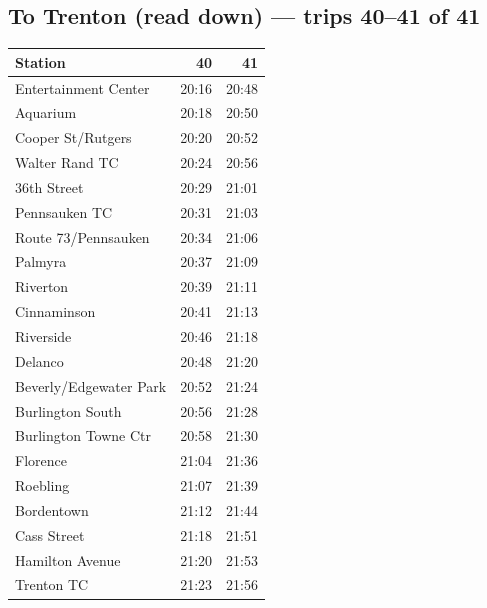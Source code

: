 \subsection*{To Trenton (read down) --- trips 40--41 of 41}
\begin{center}\footnotesize\setlength{\tabcolsep}{3pt}\begin{tabular}{@{}lrr@{}}\toprule
Station & 40 & 41 \\\midrule
Entertainment Center & 20:16 & 20:48 \\
Aquarium & 20:18 & 20:50 \\
Cooper St/Rutgers & 20:20 & 20:52 \\
Walter Rand TC & 20:24 & 20:56 \\
36th Street & 20:29 & 21:01 \\
Pennsauken TC & 20:31 & 21:03 \\
Route 73/Pennsauken & 20:34 & 21:06 \\
Palmyra & 20:37 & 21:09 \\
Riverton & 20:39 & 21:11 \\
Cinnaminson & 20:41 & 21:13 \\
Riverside & 20:46 & 21:18 \\
Delanco & 20:48 & 21:20 \\
Beverly/Edgewater Park & 20:52 & 21:24 \\
Burlington South & 20:56 & 21:28 \\
Burlington Towne Ctr & 20:58 & 21:30 \\
Florence & 21:04 & 21:36 \\
Roebling & 21:07 & 21:39 \\
Bordentown & 21:12 & 21:44 \\
Cass Street & 21:18 & 21:51 \\
Hamilton Avenue & 21:20 & 21:53 \\
Trenton TC & 21:23 & 21:56 \\
\bottomrule\end{tabular}\end{center}

